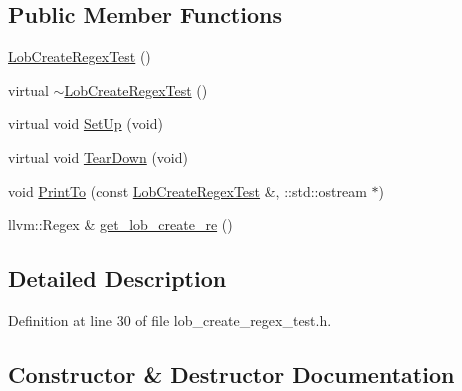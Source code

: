 \subsection*{Public Member Functions}
\begin{DoxyCompactItemize}
\item 
\hyperlink{classclang_1_1tidy_1_1pagesjaunes_1_1test_1_1_lob_create_regex_test_a471271ef22a494cd7a5e54d580d7ba88}{Lob\+Create\+Regex\+Test} ()
\item 
virtual \hyperlink{classclang_1_1tidy_1_1pagesjaunes_1_1test_1_1_lob_create_regex_test_a6c22b58cecbf20c670b7ff5eabdd97f4}{$\sim$\+Lob\+Create\+Regex\+Test} ()
\item 
virtual void \hyperlink{classclang_1_1tidy_1_1pagesjaunes_1_1test_1_1_lob_create_regex_test_a8c0cd62e6ec6dec8758d7698c654101d}{Set\+Up} (void)
\item 
virtual void \hyperlink{classclang_1_1tidy_1_1pagesjaunes_1_1test_1_1_lob_create_regex_test_af707b8015150c8ef157624b6543f8f2f}{Tear\+Down} (void)
\item 
void \hyperlink{classclang_1_1tidy_1_1pagesjaunes_1_1test_1_1_lob_create_regex_test_a41753553921067dbb040b2a778791bd8}{Print\+To} (const \hyperlink{classclang_1_1tidy_1_1pagesjaunes_1_1test_1_1_lob_create_regex_test}{Lob\+Create\+Regex\+Test} \&, \+::std\+::ostream $\ast$)
\item 
llvm\+::\+Regex \& \hyperlink{classclang_1_1tidy_1_1pagesjaunes_1_1test_1_1_lob_create_regex_test_a1a59a46c1639717884b2fc92e5740e17}{get\+\_\+lob\+\_\+create\+\_\+re} ()
\end{DoxyCompactItemize}


\subsection{Detailed Description}


Definition at line 30 of file lob\+\_\+create\+\_\+regex\+\_\+test.\+h.



\subsection{Constructor \& Destructor Documentation}
\mbox{\label{classclang_1_1tidy_1_1pagesjaunes_1_1test_1_1_lob_create_regex_test_a471271ef22a494cd7a5e54d580d7ba88}} 
